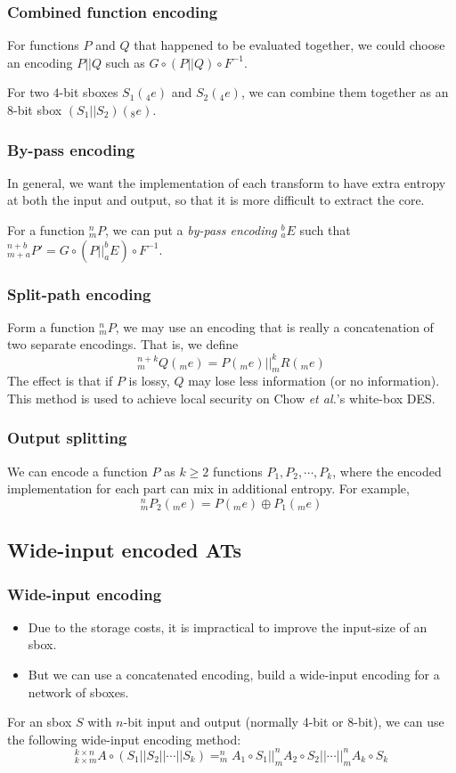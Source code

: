 \documentclass{beamer}
\begin{document}
\frame
{
\frametitle{Combined function encoding}
For functions $P$ and $Q$ that happened to be evaluated  together, we could choose an encoding $P||Q$ such as $G\circ (P||Q) \circ F^{-1}$.\newline

For two $4$-bit sboxes $S_{1}(_{4}e)$ and $S_{2}(_{4}e)$, we can combine them together as an $8$-bit sbox $(S_{1}||S_{2})(_{8}e)$.

}

\frame
{
\frametitle{By-pass encoding}
In general, we want the implementation of each transform to have extra entropy at both the input and output, so that it is more difficult to extract the core.\newline

For a function $^{n}_{m}P$, we can put a \textit{by-pass encoding} $^{b}_{a}E$ such that $^{n+b}_{m+a}P'=G\circ (P||^{b}_{a}E)\circ F^{-1}$.
}

\frame
{
\frametitle{Split-path encoding}
Form a function $^{n}_{m}P$, we may use an encoding that is \textcolor[rgb]{1.00,0.00,0.00}{really a concatenation of two separate encodings}. That is, we define
\[^{n+k}_{m}Q(_{m}e)=P(_{m}e)||^{k}_{m}R(_{m}e)\]
The effect is that if $P$ is lossy, $Q$ may lose less information (or no information). This method is used to achieve \textcolor[rgb]{1.00,0.00,0.00}{local security} on Chow \textit{et al.}'s white-box DES.
}

\frame
{
\frametitle{Output splitting}
We can encode a function $P$ as $k \geq 2$ functions $P_{1}, P_{2}, \cdots, P_{k}$, where the encoded implementation for each part can mix in additional entropy. For example, \[^{n}_{m}P_{2}(_{m}e) =P(_{m}e) \oplus P_{1}(_{m}e)\]

}

\subsection{Wide-input encoded ATs}

\frame
{
\frametitle{Wide-input encoding}
\begin{itemize}
\item Due to the storage costs, it is impractical to improve the input-size of an sbox.

\item But we can use a concatenated encoding, build a wide-input encoding for a network of sboxes.
\end{itemize}

For an sbox $S$ with $n$-bit input and output (normally 4-bit or 8-bit), we can use the following wide-input encoding method:
\[^{k\times n}_{k\times m}A \circ (S_{1}||S_{2}||\cdots||S_{k})= ^{n}_{m}A_{1} \circ S_{1}||^{n}_{m}A_{2} \circ S_{2}||\cdots||^{n}_{m}A_{k} \circ S_{k}\]
}
\end{document}
